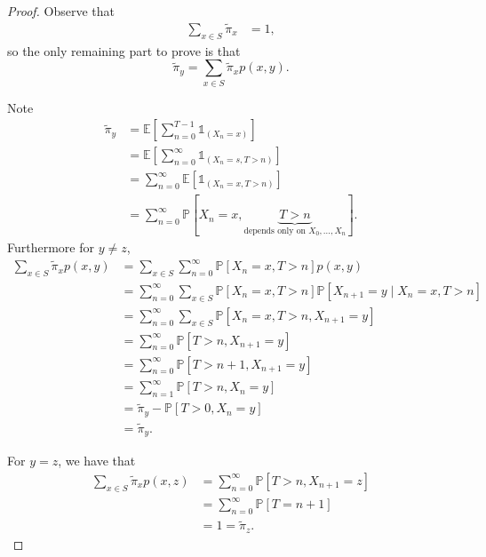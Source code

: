\documentclass{tufte-handout}
\newcommand*\E{\mathbb{E}}
\renewcommand*\P{\mathbb{P}}
\theoremstyle{definition}
\begin{document}
\begin{proof}
	Observe that
	\begin{align*}
		\sum\limits_{x \in S}^{} \tilde{\pi}_x &= 1
	,\end{align*} so the only remaining part to prove is that \[
	\tilde{\pi}_y = \sum\limits_{x \in S} \tilde{\pi}_x p(x,y)
	.\] 

	Note
	\begin{align*}
		\tilde{\pi}_y &= \E\left[\sum\limits_{n=0}^{T-1} \mathds{1}_{\left( X_n = x \right)}\right]  \\
					  &= \E\left[\sum\limits_{n=0}^{\infty} \mathds{1}_{\left( X_n = s, T > n \right)}\right]  \\
					  &= \sum\limits_{n=0}^{\infty} \E\left[\mathds{1}_{\left( X_n = x, T > n \right)}\right]  \\
					  &= \sum\limits_{n= 0}^{\infty} \P\left[X_n = x, \underbrace{T > n}_{\text{depends only on $X_0,\ldots,X_n$}}\right]
	.\end{align*}
	Furthermore for $y \ne z$, 
	\begin{align*}
		\sum\limits_{x \in S}^{} \tilde{\pi}_x p(x,y) &= \sum\limits_{x \in S}^{} \sum\limits_{n=0}^{\infty} \P\left[X_n = x, T >n\right] p(x,y) \\
													  &= \sum\limits_{n=0}^{\infty} \sum\limits_{x \in S}^{} \P\left[X_n = x, T > n\right] \P\left[X_{n+1} = y \mid X_n = x, T > n\right]  \\
													  &= \sum\limits_{n=0}^{\infty} \sum\limits_{x \in S}^{} \P\left[X_n = x, T > n, X_{n+1} = y\right]  \\
													  &= \sum\limits_{n=0}^{\infty} \P\left[T > n, X_{n+1} = y\right] \\
													  &= \sum\limits_{n=0}^{\infty} \P\left[T > n+1, X_{n+1} = y\right]  \\
													  &= \sum\limits_{n=1}^{\infty} \P\left[T > n, X_n = y\right] \\
													  &= \tilde{\pi}_y - \P\left[T > 0, X_n = y\right]  \\
													  &= \tilde{\pi}_y
	.\end{align*}

	For $y = z$, we have that 
	\begin{align*}
		\sum\limits_{x \in S}^{} \tilde{\pi}_x p(x,z) &= \sum\limits_{n=0}^{\infty} \P\left[T > n, X_{n+1} = z\right]  \\
		&= \sum\limits_{n=0}^{\infty} \P\left[T = n+1\right]  \\
		&= 1 = \tilde{\pi}_z
	.\end{align*}
\end{proof}
\end{document}
